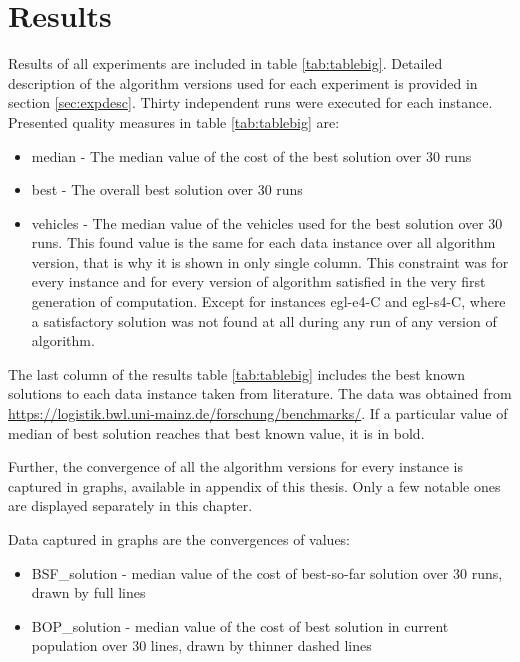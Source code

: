 \documentclass[twoside]{ctuthesis}
\theoremstyle{plain}
\theoremstyle{definition}
\theoremstyle{note}
\begin{document}
\section{Results}
\label{sec:results}

Results of all experiments are included in table \ref{tab:tablebig}. Detailed description of the algorithm versions used for each experiment is provided in section \ref{sec:expdesc}.
Thirty independent runs were executed for each instance. Presented quality measures in table \ref{tab:tablebig} are:
\begin{itemize}
	\item median - The median value of the cost of the best solution over 30 runs 
	\item best - The overall best solution over 30 runs
	\item vehicles - The median value of the vehicles used for the best solution over 30 runs. This found value is the same for each data instance over all algorithm version, that is why it is shown in only single column. This constraint was for every instance and for every version of algorithm satisfied in the very first generation of computation. Except for instances egl-e4-C and egl-s4-C, where a satisfactory solution was not found at all during any run of any version of algorithm.
\end{itemize}
The last column of the results table \ref{tab:tablebig} includes the best known solutions to each data instance taken from literature. The data was obtained from \url{https://logistik.bwl.uni-mainz.de/forschung/benchmarks/}. If a particular value of median of best solution reaches that best known value, it is in bold.




Further, the convergence of all the algorithm versions for every instance is captured in graphs, available in appendix of this thesis. Only a few notable ones are displayed separately in this chapter.

Data captured in graphs are the convergences of values:
\begin{itemize}
	\item BSF\_solution - median value of the cost of best-so-far solution over 30 runs, drawn by full lines
	\item BOP\_solution - median value of the cost of best solution in current population over 30 lines, drawn by thinner dashed lines
\end{itemize}
\end{document}
